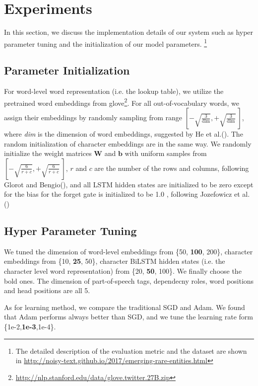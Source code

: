 \section{Experiments}
\label{sec:eval}
In this section, we discuss the implementation details of our system such as hyper parameter tuning and the initialization of our model parameters. 
\footnote{The detailed description of the evaluation metric and the dataset are shown in \url{http://noisy-text.github.io/2017/emerging-rare-entities.html}}
\subsection{Parameter Initialization}
For word-level word representation (i.e. the lookup table), 
we utilize the pretrained word embeddings from glove\footnote{\url{http://nlp.stanford.edu/data/glove.twitter.27B.zip}}.
For all out-of-vocabulary words, we assign their embeddings by randomly sampling from range $\left[-\sqrt{\frac{3}{\text{dim}}}, +\sqrt{\frac{3}{\text{dim}}}~\right]$, where \textit{dim} is the dimension of word embeddings, suggested by He et al.(\citeyear{DBLP:conf/iccv/HeZRS15}). The random initialization of character embeddings are in the same way.
We randomly initialize the weight matrices $\mathbf{W}$ and $\mathbf{b}$ with uniform samples from 
$\left[-\sqrt{\frac{6}{r+c}}, +\sqrt{\frac{6}{r+c}}~\right]$, 
$r$ and $c$ are the number of the rows and columns, following Glorot and Bengio(\citeyear{DBLP:journals/jmlr/GlorotB10}), and all LSTM hidden states are initialized to be zero except for the bias for the forget gate is initialized to be 1.0 , following Jozefowicz et al.(\citeyear{DBLP:conf/icml/JozefowiczZS15}) 


\subsection{Hyper Parameter Tuning}
We tuned the dimension of word-level embeddings from \{50, \textbf{100}, 200\}, character embeddings from \{10, \textbf{25}, 50\}, character BiLSTM hidden states (i.e. the character level word representation)  from  \{20, \textbf{50}, 100\}. 
We finally choose the bold ones.
The dimension of part-of-speech tags, dependecny roles, word positions and head positions are all 5.

As for learning method, we compare the traditional SGD and Adam\cite{}.
We found that Adam performs always better than SGD, and we tune the learning rate form \{1e-2,\textbf{1e-3},1e-4\}.

